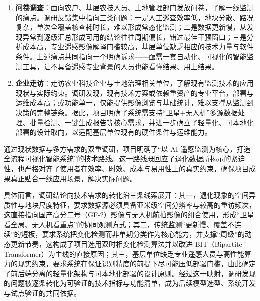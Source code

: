 \begin{enumerate}
    \item \textbf{问卷调查}：面向农户、基层农技人员、土地管理部门发放问卷，了解一线监测的痛点。调研反馈集中指向三类问题：一是人工巡查效率低，地块分散、路况复杂，单次全覆盖核查耗时长，难以形成常态化监测；二是数据更新慢，从发现异常到逐级汇总形成可用的结论往往周期偏长，错过最佳干预窗口；三是分析成本高，专业遥感影像解译门槛较高，基层单位缺乏相应的技术力量与软件条件。上述痛点共同指向一个明确诉求——亟需一套自动化、可视化的智能监测工具，让不具备遥感专业背景的人员也能看懂结果、用上结果。
    \item \textbf{企业走访}：走访农业科技企业与土地治理相关单位，了解现有监测技术的应用现状与实际约束。调研发现，现有技术方案或依赖重资产的专业平台，部署与运维成本高；或功能单一，仅能提供影像浏览与基础统计，难以支撑从监测到决策的完整链条。据此，项目明确了系统需支持“卫星+无人机”多源数据处理、批量检测、一键生成报告等核心需求，并进一步确立了轻量化、可本地化部署的设计取向，以适配基层单位现有的硬件条件与运维能力。
\end{enumerate}

通过现状数据与多方需求的双重调研，项目明确了“以 AI 遥感监测为核心，打造全流程可视化智能系统”的技术路线。这一路线既回应了退化数据所揭示的紧迫性，也严格对齐了使用者在效率、时效、成本与易用性上的真实约束，确保项目成果真正贴合一线应用场景，解决实际问题。

具体而言，调研结论向技术需求的转化沿三条线索展开：其一，退化现象的空间异质性与地块尺度特征，要求数据源必须具备亚米级空间分辨率与较高的重访频次，这直接指向国产高分二号（GF-2）影像与无人机航拍影像的组合使用，形成“卫星看全局、无人机看重点”的协同观测方式；其二，传统监测“更新慢、覆盖不连续”的短板，要求系统把变化检测而非单期分类作为核心能力，并支撑“周级”的动态更新节奏，这构成了项目选用双时相变化检测算法并以改进 BIT（Bipartite Transformer）为主线的直接原因；其三，基层单位缺乏专业遥感人员与高性能算力的现实约束，要求系统在保证识别精度的前提下尽可能压低部署门槛，由此确定了前后端分离的轻量化架构与可本地化部署的设计原则。经过这一映射，调研发现的问题被逐条转化为可验证的技术指标与功能清单，成为后续模型选型、系统开发与试点验证的共同依据。

